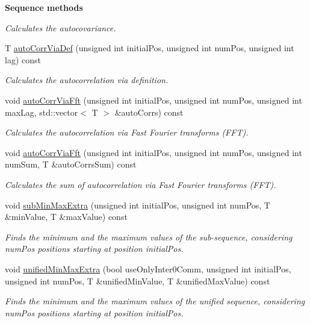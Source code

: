 \begin{Indent}{\bf Sequence methods}
\begin{DoxyCompactItemize}
\begin{DoxyCompactList}\small\item\em Calculates the autocovariance. \end{DoxyCompactList}\item 
T \hyperlink{class_q_u_e_s_o_1_1_scalar_sequence_a9de3f6734bfc399e527c867d961446c9}{auto\-Corr\-Via\-Def} (unsigned int initial\-Pos, unsigned int num\-Pos, unsigned int lag) const 
\begin{DoxyCompactList}\small\item\em Calculates the autocorrelation via definition. \end{DoxyCompactList}\item 
void \hyperlink{class_q_u_e_s_o_1_1_scalar_sequence_a16c4cde46b40e10dd306bbb95e832469}{auto\-Corr\-Via\-Fft} (unsigned int initial\-Pos, unsigned int num\-Pos, unsigned int max\-Lag, std\-::vector$<$ T $>$ \&auto\-Corrs) const 
\begin{DoxyCompactList}\small\item\em Calculates the autocorrelation via Fast Fourier transforms (F\-F\-T). \end{DoxyCompactList}\item 
void \hyperlink{class_q_u_e_s_o_1_1_scalar_sequence_abc8219f5b9459ff7ffb0a8ae9fa317de}{auto\-Corr\-Via\-Fft} (unsigned int initial\-Pos, unsigned int num\-Pos, unsigned int num\-Sum, T \&auto\-Corrs\-Sum) const 
\begin{DoxyCompactList}\small\item\em Calculates the sum of autocorrelation via Fast Fourier transforms (F\-F\-T). \end{DoxyCompactList}\item 
void \hyperlink{class_q_u_e_s_o_1_1_scalar_sequence_aee81b99614cc5836be198c0cf20879a5}{sub\-Min\-Max\-Extra} (unsigned int initial\-Pos, unsigned int num\-Pos, T \&min\-Value, T \&max\-Value) const 
\begin{DoxyCompactList}\small\item\em Finds the minimum and the maximum values of the sub-\/sequence, considering {\ttfamily num\-Pos} positions starting at position {\ttfamily initial\-Pos}. \end{DoxyCompactList}\item 
void \hyperlink{class_q_u_e_s_o_1_1_scalar_sequence_a6d63ff25462ff1366608bd37fe59165a}{unified\-Min\-Max\-Extra} (bool use\-Only\-Inter0\-Comm, unsigned int initial\-Pos, unsigned int num\-Pos, T \&unified\-Min\-Value, T \&unified\-Max\-Value) const 
\begin{DoxyCompactList}\small\item\em Finds the minimum and the maximum values of the unified sequence, considering {\ttfamily num\-Pos} positions starting at position {\ttfamily initial\-Pos}. \end{DoxyCompactList}\item 

\end{DoxyCompactItemize}
\end{Indent}

